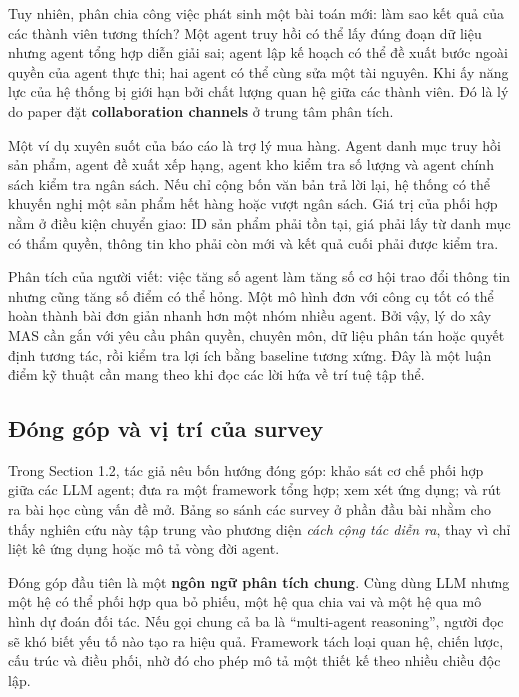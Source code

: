 Tuy nhiên, phân chia công việc phát sinh một bài toán mới: làm sao kết
quả của các thành viên tương thích? Một agent truy hồi có thể lấy đúng
đoạn dữ liệu nhưng agent tổng hợp diễn giải sai; agent lập kế hoạch có
thể đề xuất bước ngoài quyền của agent thực thi; hai agent có thể cùng
sửa một tài nguyên. Khi ấy năng lực của hệ thống bị giới hạn bởi chất
lượng quan hệ giữa các thành viên. Đó là lý do paper đặt
\textbf{collaboration channels} ở trung tâm phân tích.

Một ví dụ xuyên suốt của báo cáo là trợ lý mua hàng. Agent danh mục truy
hồi sản phẩm, agent đề xuất xếp hạng, agent kho kiểm tra số lượng và
agent chính sách kiểm tra ngân sách. Nếu chỉ cộng bốn văn bản trả lời
lại, hệ thống có thể khuyến nghị một sản phẩm hết hàng hoặc vượt ngân
sách. Giá trị của phối hợp nằm ở điều kiện chuyển giao: ID sản phẩm phải
tồn tại, giá phải lấy từ danh mục có thẩm quyền, thông tin kho phải còn
mới và kết quả cuối phải được kiểm tra.

Phân tích của người viết: việc tăng số agent làm tăng số cơ hội trao đổi
thông tin nhưng cũng tăng số điểm có thể hỏng. Một mô hình đơn với công
cụ tốt có thể hoàn thành bài đơn giản nhanh hơn một nhóm nhiều agent.
Bởi vậy, lý do xây MAS cần gắn với yêu cầu phân quyền, chuyên môn, dữ
liệu phân tán hoặc quyết định tương tác, rồi kiểm tra lợi ích bằng
baseline tương xứng. Đây là một luận điểm kỹ thuật cần mang theo khi đọc
các lời hứa về trí tuệ tập thể.

\subsection{Đóng góp và vị trí của
survey}\label{ux111uxf3ng-guxf3p-vuxe0-vux1ecb-truxed-cux1ee7a-survey}

Trong Section 1.2, tác giả nêu bốn hướng đóng góp: khảo sát cơ chế phối
hợp giữa các LLM agent; đưa ra một framework tổng hợp; xem xét ứng dụng;
và rút ra bài học cùng vấn đề mở. Bảng so sánh các survey ở phần đầu bài
nhằm cho thấy nghiên cứu này tập trung vào phương diện \emph{cách cộng
tác diễn ra}, thay vì chỉ liệt kê ứng dụng hoặc mô tả vòng đời agent.

Đóng góp đầu tiên là một \textbf{ngôn ngữ phân tích chung}. Cùng dùng
LLM nhưng một hệ có thể phối hợp qua bỏ phiếu, một hệ qua chia vai và
một hệ qua mô hình dự đoán đối tác. Nếu gọi chung cả ba là ``multi-agent
reasoning'', người đọc sẽ khó biết yếu tố nào tạo ra hiệu quả. Framework
tách loại quan hệ, chiến lược, cấu trúc và điều phối, nhờ đó cho phép mô
tả một thiết kế theo nhiều chiều độc lập.


